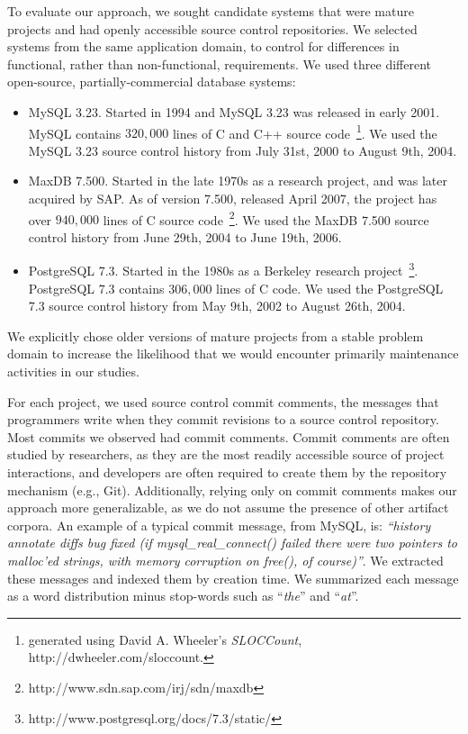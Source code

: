 \documentclass[smallextended]{svjour3}       %
\begin{document}
To evaluate our approach, we sought candidate systems that were mature projects and had openly accessible source control repositories. 
We selected systems from the same application domain, to control for differences in functional, rather than non-functional, requirements. 
We used three different open-source, partially-commercial database systems:
\begin{itemize}
\item  MySQL 3.23. Started in 1994 and MySQL 3.23 was released in early 2001. MySQL contains $320,000$ lines of C and C++ source code~\footnote{generated
using David A. Wheeler's \emph{SLOCCount},
{http://dwheeler.com/sloccount}.}. We used the MySQL 3.23 source control  history from July
31st, 2000 to August 9th, 2004.
\item MaxDB 7.500. Started in the late 1970s as a research project, and was later acquired by SAP. As of version 7.500, released April 2007, the project
has over $940,000$ lines of C source
code~\footnote{{http://www.sdn.sap.com/irj/sdn/maxdb}}. 
 We used the MaxDB 7.500 source control history from June
29th, 2004 to June 19th, 2006.
\item PostgreSQL 7.3. Started in the 1980s as a Berkeley research
  project~\footnote{{http://www.postgresql.org/docs/7.3/static/}}. PostgreSQL
  7.3 contains $306,000$ lines of C code.
 We used the PostgreSQL 7.3 source control  history from May 9th, 2002 to 
 August 26th, 2004.

\end{itemize}
  
We explicitly chose older versions of mature projects from a stable problem domain to increase the likelihood that we would encounter primarily
maintenance activities in our studies.

For each project, we used source control commit comments, the messages
that programmers write when they commit revisions to a source control
repository. 
Most commits we observed had commit comments.
Commit comments are often studied by researchers, as they are the most readily accessible source of project interactions, and developers are often
required to create them by the repository mechanism (e.g., Git).  Additionally, relying only on commit comments makes our approach more generalizable,
as we do not assume the presence of other artifact corpora.
An example of a typical commit message, from MySQL, is: \textit{``history annotate diffs bug fixed (if mysql\-\_real\-\_connect() failed there were
two pointers to malloc'ed strings, with memory corruption on free(), of course)''}. 
We extracted these messages and indexed them by creation time. 
We summarized each message as a word distribution minus stop-words such as ``\emph{the}'' and ``\emph{at}''. 
\end{document}
